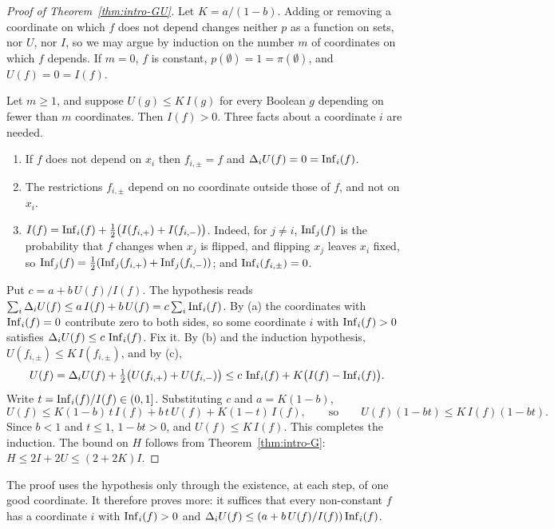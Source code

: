 \begin{proof}[Proof of Theorem~\ref{thm:intro-GU}]\label{proof:thm:intro-GU}
Let $K=a/(1-b)$. Adding or removing a coordinate on which $f$ does not depend changes neither $p$ as a function on sets, nor $U$, nor $I$, so we may argue by induction on the number $m$ of coordinates on which $f$ depends. If $m=0$, $f$ is constant, $p(\emptyset)=1=\pi(\emptyset)$, and $U(f)=0=I(f)$.

Let $m\ge1$, and suppose $U(g)\le K\,I(g)$ for every Boolean $g$ depending on fewer than $m$ coordinates. Then $I(f)>0$. Three facts about a coordinate $i$ are needed.
\begin{enumerate}[label=(\alph*)]
\item If $f$ does not depend on $x_i$ then $f_{i,\pm}=f$ and $\Delta_iU(f)=0=\operatorname{Inf}_i(f)$.
\item The restrictions $f_{i,\pm}$ depend on no coordinate outside those of $f$, and not on $x_i$.
\item $I(f)=\operatorname{Inf}_i(f)+\frac12\bigl(I(f_{i,+})+I(f_{i,-})\bigr)$. Indeed, for $j\ne i$, $\operatorname{Inf}_j(f)$ is the probability that $f$ changes when $x_j$ is flipped, and flipping $x_j$ leaves $x_i$ fixed, so $\operatorname{Inf}_j(f)=\frac12(\operatorname{Inf}_j(f_{i,+})+\operatorname{Inf}_j(f_{i,-}))$; and $\operatorname{Inf}_i(f_{i,\pm})=0$.
\end{enumerate}
Put $c=a+b\,U(f)/I(f)$. The hypothesis reads $\sum_i\Delta_iU(f)\le a\,I(f)+b\,U(f)=c\sum_i\operatorname{Inf}_i(f)$. By (a) the coordinates with $\operatorname{Inf}_i(f)=0$ contribute zero to both sides, so some coordinate $i$ with $\operatorname{Inf}_i(f)>0$ satisfies $\Delta_iU(f)\le c\,\operatorname{Inf}_i(f)$. Fix it. By (b) and the induction hypothesis, $U(f_{i,\pm})\le K\,I(f_{i,\pm})$, and by (c),
\[
U(f)=\Delta_iU(f)+\tfrac12\bigl(U(f_{i,+})+U(f_{i,-})\bigr)\le c\,\operatorname{Inf}_i(f)+K\bigl(I(f)-\operatorname{Inf}_i(f)\bigr).
\]
Write $t=\operatorname{Inf}_i(f)/I(f)\in(0,1]$. Substituting $c$ and $a=K(1-b)$,
\[
U(f)\le K(1-b)\,t\,I(f)+b\,t\,U(f)+K(1-t)\,I(f),\qquad\text{so}\qquad U(f)(1-bt)\le K\,I(f)(1-bt).
\]
Since $b<1$ and $t\le1$, $1-bt>0$, and $U(f)\le K\,I(f)$. This completes the induction. The bound on $H$ follows from Theorem~\ref{thm:intro-G}: $H\le2I+2U\le(2+2K)I$.
\end{proof}

The proof uses the hypothesis only through the existence, at each step, of one good coordinate. It therefore proves more: it suffices that every non-constant $f$ has a coordinate $i$ with $\operatorname{Inf}_i(f)>0$ and $\Delta_iU(f)\le(a+b\,U(f)/I(f))\operatorname{Inf}_i(f)$.
